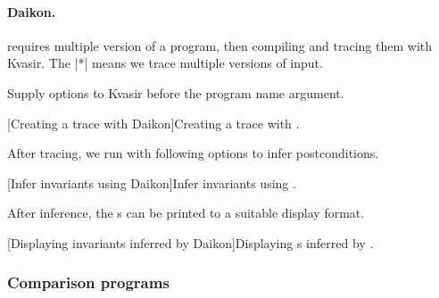 \paragraph*{Daikon.}
 requires multiple version of a program, then compiling and tracing them with Kvasir.
The \pr|*| means we trace multiple versions of input.
\newline

Supply options to Kvasir before the program name argument.

\begin{center}
\begin{minipage}{\textwidth}
\captionsetup{type=lstlisting}
[Creating a trace with Daikon]{Creating a trace with .}
\label{lst:kvasir-bash}
\end{minipage}
\end{center}

After tracing, we run  with following options to infer postconditions.

\begin{center}
\begin{minipage}{\textwidth}
\captionsetup{type=lstlisting}
[Infer invariants using Daikon]{Infer invariants using .}
\label{lst:daikon-bash}
\end{minipage}
\end{center}

After inference, the s can be printed to a suitable display format.

\begin{center}
\begin{minipage}{\textwidth}
\captionsetup{type=lstlisting}
[Displaying invariants inferred by Daikon]{Displaying s inferred by .}
\label{lst:print-bash}
\end{minipage}
\end{center}

\subsubsection{Comparison programs}
\label{subsec:comparison-programs}

